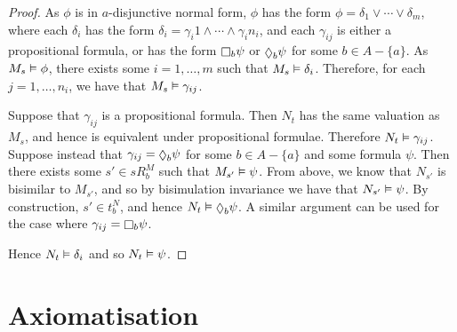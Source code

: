 \begin{proof}
As $\phi$ is in $a$-disjunctive normal form, $\phi$ has the form $\phi =
\delta_1 \lor \cdots \lor \delta_m$, where each $\delta_i$ has the form
$\delta_i = \gamma_i1 \land \cdots \land \gamma_i{n_i}$, and each $\gamma_{ij}$ is
either a propositional formula, or has the form $\knows_b \psi$ or $\suspects_b
\psi$ for some $b \in A - \{a\}$.  As $M_s \vDash \phi$, there exists some $i
= 1, \dots, m$ such that $M_s \vDash \delta_i$. Therefore, for each $j = 1,
\dots, n_i$, we have that $M_s \vDash \gamma_{ij}$. 

Suppose that $\gamma_{ij}$ is a propositional formula. Then $N_t$ has the same
valuation as $M_s$, and hence is equivalent under propositional formulae.
Therefore $N_t \vDash \gamma_{ij}$.  Suppose instead that $\gamma_{ij} = \suspects_b
\psi$ for some $b \in A - \{a\}$ and some formula $\psi$. Then there exists some
$s' \in sR^M_b$ such that $M_{s'} \vDash \psi$. From above, we know that
$N_{s'}$ is bisimilar to $M_{s'}$, and so by bisimulation invariance we have
that $N_{s'} \vDash \psi$.  By construction, $s' \in t^N_b$, and hence $N_t
\entails \suspects_b \psi$. A similar argument can be used for the case where
$\gamma_{ij} = \knows_b \psi$.  

Hence $N_t \vDash \delta_i$ and so $N_t \vDash \psi$.
\end{proof}

\section{Axiomatisation}

